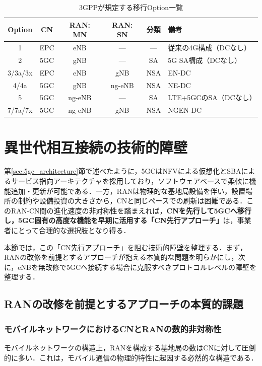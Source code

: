 \begin{table}[htbp]
  \centering
  \caption{3GPPが規定する移行Option一覧}
  \label{tab:migration_options}
  \begin{tabular}{c|c|c|c|c|l}
    \hline
    Option & CN & RAN: MN & RAN: SN & 分類 & 備考 \\
    \hline\hline
    1 & EPC & eNB & --- & --- & 従来の4G構成（DCなし） \\
    2 & 5GC & gNB & --- & SA & 5G SA構成（DCなし） \\
    3/3a/3x & EPC & eNB & gNB & NSA & EN-DC \\
    4/4a & 5GC & gNB & ng-eNB & NSA & NE-DC \\
    5 & 5GC & ng-eNB & --- & SA & LTE+5GCのSA（DCなし） \\
    7/7a/7x & 5GC & ng-eNB & gNB & NSA & NGEN-DC \\
    \hline
  \end{tabular}
\end{table}

\section{異世代相互接続の技術的障壁}

第\ref{sec:5gc_architecture}節で述べたように，5GCはNFVによる仮想化とSBAによるサービス指向アーキテクチャを採用しており，ソフトウェアベースで柔軟に機能追加・更新が可能である．一方，RANは物理的な基地局設備を伴い，設置場所の制約や設備投資の大きさから，CNと同じペースでの刷新は困難である．このRAN-CN間の進化速度の非対称性を踏まえれば，\textbf{CNを先行して5GCへ移行し，5GC固有の高度な機能を早期に活用する「CN先行アプローチ」}は，事業者にとって合理的な選択肢となり得る．

本節では，この「CN先行アプローチ」を阻む技術的障壁を整理する．まず，RANの改修を前提とするアプローチが抱える本質的な問題を明らかにし，次に，eNBを無改修で5GCへ接続する場合に克服すべきプロトコルレベルの障壁を整理する．

\subsection{RANの改修を前提とするアプローチの本質的課題}

\subsubsection{モバイルネットワークにおけるCNとRANの数的非対称性}
モバイルネットワークの構造上，RANを構成する基地局の数はCNに対して圧倒的に多い．これは，モバイル通信の物理的特性に起因する必然的な構造である．


